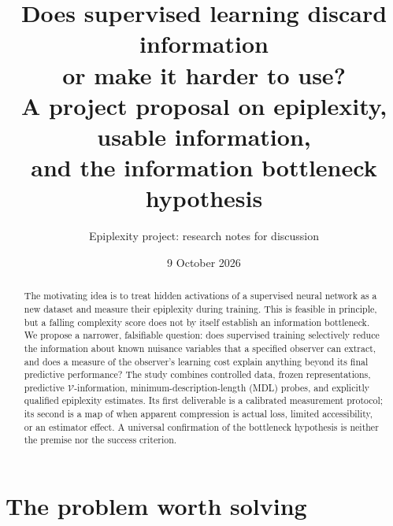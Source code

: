 \documentclass[11pt,a4paper]{article}
\title{\textbf{Does supervised learning discard information\\or make it harder to use?}\\[0.6em]
\large A project proposal on epiplexity, usable information,\\and the information bottleneck hypothesis}
\author{Epiplexity project: research notes for discussion}
\date{9 October 2026}
\newcommand{\V}{\mathcal V}
\begin{document}
\maketitle
\begin{abstract}
The motivating idea is to treat hidden activations of a supervised neural network as a new dataset and measure their epiplexity during training. This is feasible in principle, but a falling complexity score does not by itself establish an information bottleneck. We propose a narrower, falsifiable question: does supervised training selectively reduce the information about known nuisance variables that a specified observer can extract, and does a measure of the observer's learning cost explain anything beyond its final predictive performance? The study combines controlled data, frozen representations, predictive $\V$-information, minimum-description-length (MDL) probes, and explicitly qualified epiplexity estimates. Its first deliverable is a calibrated measurement protocol; its second is a map of when apparent compression is actual loss, limited accessibility, or an estimator effect. A universal confirmation of the bottleneck hypothesis is neither the premise nor the success criterion.
\end{abstract}

\begin{center}
\end{center}

\newpage
\tableofcontents
\newpage

\section{The problem worth solving}
\end{document}
